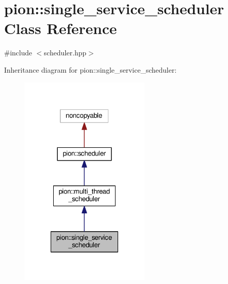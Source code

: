 \hypertarget{classpion_1_1single__service__scheduler}{\section{pion\-:\-:single\-\_\-service\-\_\-scheduler Class Reference}
\label{classpion_1_1single__service__scheduler}
}


{\ttfamily \#include $<$scheduler.\-hpp$>$}



Inheritance diagram for pion\-:\-:single\-\_\-service\-\_\-scheduler\-:
\nopagebreak
\begin{figure}[H]
\begin{center}
\leavevmode
\includegraphics[width=178pt]{classpion_1_1single__service__scheduler__inherit__graph}
\end{center}
\end{figure}


